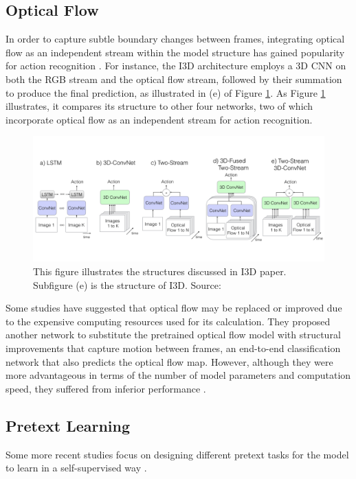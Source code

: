 \subsection{Optical Flow}
In order to capture subtle boundary changes between frames, integrating optical flow as an independent stream within the model structure has gained popularity for action recognition \parencite{sevilla2019integration, tran2015learning, carreira2017quo}. For instance, the I3D architecture \parencite{carreira2017quo} employs a 3D CNN on both the RGB stream and the optical flow stream, followed by their summation to produce the final prediction, as illustrated in (e) of Figure \ref{fig:structuresi3d}. As Figure \ref{fig:structuresi3d} illustrates, it compares its structure to other four networks, two of which incorporate optical flow as an independent stream for action recognition.

\begin{figure}[ht]
    \centering
    \includegraphics[width=1.0\textwidth]{assets/charts_rw/I3D}
    \caption[Illustration of Structures Discussed in I3D]{This figure illustrates the structures discussed in I3D paper. Subfigure (e) is the structure of I3D. Source: \parencite{carreira2017quo}}
    \label{fig:structuresi3d}
\end{figure}

Some studies have suggested that optical flow may be replaced or improved due to the expensive computing resources used for its calculation. They proposed another network to substitute the pretrained optical flow model with structural improvements that capture motion between frames, an end-to-end classification network that also predicts the optical flow map. However, although they were more advantageous in terms of the number of model parameters and computation speed, they suffered from inferior performance \parencite{Lee_2018_ECCV, 8354283, Piergiovanni_2019_CVPR}.

\subsection{Pretext Learning}
Some more recent studies focus on designing different pretext tasks for the model to learn in a self-supervised way \parencite{wang2022internvideo}.


